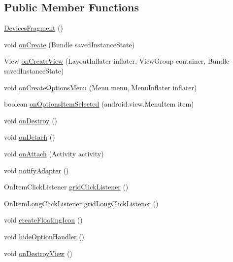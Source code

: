 \subsection*{Public Member Functions}
\begin{DoxyCompactItemize}
\item 
\hyperlink{classandroid_1_1app_1_1printerapp_1_1devices_1_1_devices_fragment_aca313884fb2a853f9a339f319b3d0110}{Devices\+Fragment} ()
\item 
void \hyperlink{classandroid_1_1app_1_1printerapp_1_1devices_1_1_devices_fragment_a5ba6feacafc1999ac78c5b2075c10e68}{on\+Create} (Bundle saved\+Instance\+State)
\item 
View \hyperlink{classandroid_1_1app_1_1printerapp_1_1devices_1_1_devices_fragment_ac3e173521247996d613eca8e0fac32bb}{on\+Create\+View} (Layout\+Inflater inflater, View\+Group container, Bundle saved\+Instance\+State)
\item 
void \hyperlink{classandroid_1_1app_1_1printerapp_1_1devices_1_1_devices_fragment_a6d1044036762231cbeb50785c3f73877}{on\+Create\+Options\+Menu} (Menu menu, Menu\+Inflater inflater)
\item 
boolean \hyperlink{classandroid_1_1app_1_1printerapp_1_1devices_1_1_devices_fragment_a03578917b628263d2174165b64f17733}{on\+Options\+Item\+Selected} (android.\+view.\+Menu\+Item item)
\item 
void \hyperlink{classandroid_1_1app_1_1printerapp_1_1devices_1_1_devices_fragment_aea50dd28789a45f91d1b3d8b1792d3b1}{on\+Destroy} ()
\item 
void \hyperlink{classandroid_1_1app_1_1printerapp_1_1devices_1_1_devices_fragment_a4b44860a04068be5f5c8b74683f20392}{on\+Detach} ()
\item 
void \hyperlink{classandroid_1_1app_1_1printerapp_1_1devices_1_1_devices_fragment_a62c5da8f553baa656cb685507da2e18b}{on\+Attach} (Activity activity)
\item 
void \hyperlink{classandroid_1_1app_1_1printerapp_1_1devices_1_1_devices_fragment_ac1a7ff99154c3f296ca011d73a0710e7}{notify\+Adapter} ()
\item 
On\+Item\+Click\+Listener \hyperlink{classandroid_1_1app_1_1printerapp_1_1devices_1_1_devices_fragment_a74ed407fbbd9bde2c63d98f0dc78e769}{grid\+Click\+Listener} ()
\item 
On\+Item\+Long\+Click\+Listener \hyperlink{classandroid_1_1app_1_1printerapp_1_1devices_1_1_devices_fragment_a1849d3da5ac6761d0d83b44633ac913b}{grid\+Long\+Click\+Listener} ()
\item 
void \hyperlink{classandroid_1_1app_1_1printerapp_1_1devices_1_1_devices_fragment_a78ef047e004167e150dc0b5ebdd5ed03}{create\+Floating\+Icon} ()
\item 
void \hyperlink{classandroid_1_1app_1_1printerapp_1_1devices_1_1_devices_fragment_adb32fcb1518656841b6725c7a8a5cbc7}{hide\+Option\+Handler} ()
\item 
void \hyperlink{classandroid_1_1app_1_1printerapp_1_1devices_1_1_devices_fragment_a031876cffc6a85b1f410315a38726b5d}{on\+Destroy\+View} ()
\end{DoxyCompactItemize}


